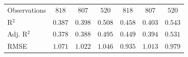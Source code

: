 \begin{center}
\begin{small}
\begin{longtable}{l@{} c@{} c@{} c@{} c@{} c@{} c@{}}
\hline
Observations                        & $818$            & $807$         & $520$         & $818$           & $807$         & $520$            \\
R$^2$                               & $0.387$          & $0.398$       & $0.508$       & $0.458$         & $0.403$       & $0.543$          \\
Adj. R$^2$                          & $0.378$          & $0.388$       & $0.495$       & $0.449$         & $0.394$       & $0.531$          \\
RMSE                                & $1.071$          & $1.022$       & $1.046$       & $0.935$         & $1.013$       & $0.979$          \\
\end{longtable}
\end{small}
\end{center}
